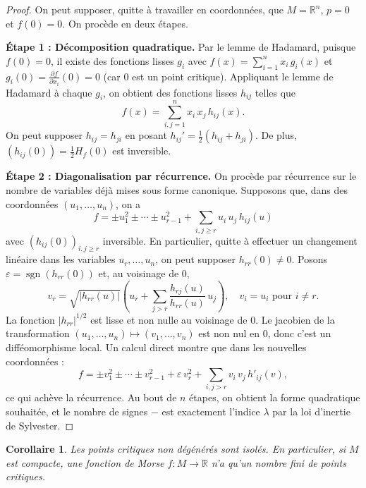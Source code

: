 \documentclass[12pt,a4paper,openany]{book}
\theoremstyle{definition}
\theoremstyle{plain}
\newtheorem{corollaire}[definition]{Corollaire}
\theoremstyle{remark}
\newcommand{\R}{\mathbb{R}}
\newcommand{\abs}[1]{\left|#1\right|}
\begin{document}
\begin{proof}
On peut supposer, quitte à travailler en coordonnées, que $M = \R^n$, $p = 0$
et $f(0) = 0$. On procède en deux étapes.

\medskip
\noindent\textbf{Étape 1 : Décomposition quadratique.}
Par le lemme de Hadamard, puisque $f(0) = 0$, il existe
des fonctions lisses $g_i$ avec $f(x) = \sum_{i=1}^n x_i \, g_i(x)$ et
$g_i(0) = \frac{\partial f}{\partial x_i}(0) = 0$ (car $0$ est un point
critique). Appliquant le lemme de Hadamard à chaque $g_i$, on obtient des
fonctions lisses $h_{ij}$ telles que
\[
  f(x) = \sum_{i,j=1}^n x_i \, x_j \, h_{ij}(x).
\]
On peut supposer $h_{ij} = h_{ji}$ en posant $h_{ij}' = \frac{1}{2}(h_{ij} + h_{ji})$.
De plus, $(h_{ij}(0)) = \frac{1}{2} H_f(0)$ est inversible.

\medskip
\noindent\textbf{Étape 2 : Diagonalisation par récurrence.}
On procède par récurrence sur le nombre de variables déjà mises sous forme
canonique. Supposons que, dans des coordonnées $(u_1, \ldots, u_n)$, on a
\[
  f = \pm u_1^2 \pm \cdots \pm u_{r-1}^2 + \sum_{i,j \geqslant r} u_i \, u_j \, h_{ij}(u)
\]
avec $(h_{ij}(0))_{i,j \geqslant r}$ inversible. En particulier, quitte à
effectuer un changement linéaire dans les variables $u_r, \ldots, u_n$, on peut
supposer $h_{rr}(0) \neq 0$. Posons $\varepsilon = \operatorname{sgn}(h_{rr}(0))$
et, au voisinage de $0$,
\[
  v_r = \sqrt{\abs{h_{rr}(u)}} \left(u_r + \sum_{j > r} \frac{h_{rj}(u)}{h_{rr}(u)} \, u_j \right),
  \quad v_i = u_i \text{ pour } i \neq r.
\]
La fonction $\abs{h_{rr}}^{1/2}$ est lisse et non nulle au voisinage de $0$.
Le jacobien de la transformation $(u_1, \ldots, u_n) \mapsto (v_1, \ldots, v_n)$
est non nul en $0$, donc c'est un difféomorphisme local. Un calcul direct montre
que dans les nouvelles coordonnées :
\[
  f = \pm v_1^2 \pm \cdots \pm v_{r-1}^2 + \varepsilon \, v_r^2
    + \sum_{i,j > r} v_i \, v_j \, h'_{ij}(v),
\]
ce qui achève la récurrence. Au bout de $n$ étapes, on obtient la forme
quadratique souhaitée, et le nombre de signes $-$ est exactement l'indice
$\lambda$ par la loi d'inertie de Sylvester.
\end{proof}

\begin{corollaire}\label{cor:morse-isoles}
Les points critiques non dégénérés sont isolés. En particulier, si $M$ est
compacte, une fonction de Morse $f : M \to \R$ n'a qu'un nombre fini de points
critiques.
\end{corollaire}
\end{document}
